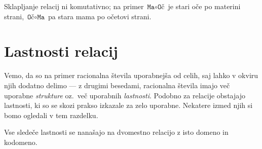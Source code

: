 \begin{zgled}
                        Sklapljanje relacij ni komutativno; na primer $\texttt{Ma} \circ \texttt{Oč}$ je stari oče po materini strani, $\texttt{Oč} \circ \texttt{Ma}$ pa stara mama po očetovi strani.

                \end{zgled}



        \section{Lastnosti relacij}\label{razdelek:lastnosti-relacij}

                Vemo, da so na primer racionalna števila uporabnejša od celih, saj lahko v okviru njih dodatno delimo --- z drugimi besedami, racionalna števila imajo več uporabne \emph{strukture} oz.~več uporabnih \emph{lastnosti}. Podobno za relacije obstajajo lastnosti, ki so se skozi prakso izkazale za zelo uporabne. Nekatere izmed njih si bomo ogledali v tem razdelku.

                Vse sledeče lastnosti se nanašajo na dvomestno relacijo z isto domeno in kodomeno.

